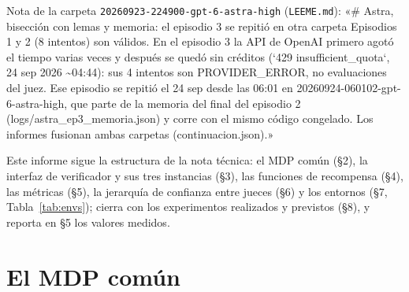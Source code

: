 \documentclass[11pt,a4paper]{article}
\begin{document}
{\sloppy Nota de la carpeta \texttt{20260923-\allowbreak{}224900-\allowbreak{}gpt-\allowbreak{}6-\allowbreak{}astra-\allowbreak{}high} (\texttt{LEEME.md}): «\# Astra, bisección con lemas y memoria: el episodio 3 se repitió en otra carpeta Episodios 1 y 2 (8 intentos) son válidos. En el episodio 3 la API de OpenAI primero agotó el tiempo varias veces y después se quedó sin créditos (`429 insufficient\_quota`{}, 24 sep 2026 \textasciitilde{}04:44): sus 4 intentos son PROVIDER\_ERROR, no evaluaciones del juez. Ese episodio se repitió el 24 sep desde las 06:01 en 20260924-060102-gpt-6-astra-high, que parte de la memoria del final del episodio 2 (logs/astra\_ep3\_memoria.json) y corre con el mismo código congelado. Los informes fusionan ambas carpetas (continuacion.json).»\par}

Este informe sigue la estructura de la nota técnica: el MDP común (§2), la interfaz de verificador y sus tres instancias (§3), las funciones de recompensa (§4), las métricas (§5), la jerarquía de confianza entre jueces (§6) y los entornos (§7, Tabla~\ref{tab:envs}); cierra con los experimentos realizados y previstos (§8), y reporta en §5 los valores medidos.

\section{El MDP común}
\end{document}
